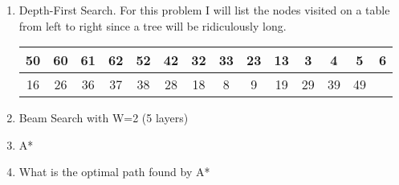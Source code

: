 \documentclass[11pt]{article}
\begin{document}
\begin{flushleft}
\begin{enumerate}
    \item Depth-First Search. For this problem I will list the nodes visited on
        a table from left to right since a tree will be ridiculously long.
        \begin{tabular}{| c | c | c | c | c | c | c | c | c | c | c | c | c | c
            |}
            \hline
            50 & 60 & 61 & 62 & 52 & 42 & 32 & 33 & 23 & 13 & 3 & 4 & 5 & 6\\
            \hline
            16 & 26 & 36 & 37 & 38 & 28 & 18 & 8 & 9 & 19 & 29 & 39 & 49&\\
            \hline
        \end{tabular}

    \item Beam Search with W=2 (5 layers)
    \item A*
    \item What is the optimal path found by A*
\end{enumerate}

\end{flushleft}
\end{document}
